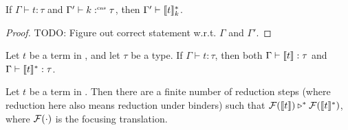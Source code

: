 \begin{lemma}
  If $\Gamma \vdash t : \tau$ and $\Gamma' \vdash k :^{\text{\tiny cns}} \tau$, then $\Gamma' \vdash \llbracket t \rrbracket_{k}^{\ast}$.
\end{lemma}
\begin{proof}
  TODO: Figure out correct statement w.r.t. $\Gamma$ and $\Gamma'$.
\end{proof}

\begin{theorem}
  Let $t$ be a term in \surfacelang, and let $\tau$ be a type.
  If $\Gamma \vdash t: \tau$, then both $\Gamma \vdash \llbracket t \rrbracket : \tau$ and $\Gamma \vdash \llbracket t \rrbracket_{}^{\ast} : \tau$.
\end{theorem}

\begin{theorem}[Correctness]
  \label{teo:correctness}
  Let $t$ be a term in \surfacelang. Then there are a finite number of reduction steps (where reduction here also means reduction under binders) such that $\mathcal{F}(\llbracket t \rrbracket) \triangleright^{\ast} \mathcal{F}(\llbracket t \rrbracket_{}^{\ast})$, where $\mathcal{F}(\cdot)$ is the focusing translation.
\end{theorem}
